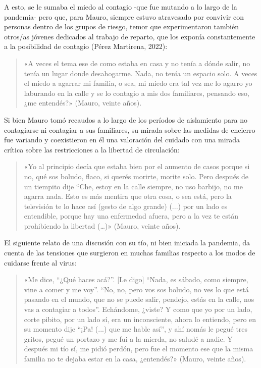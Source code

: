 A esto, se le sumaba el miedo al contagio -que fue mutando a lo largo de la pandemia- pero que, para Mauro, siempre estuvo atravesado por convivir con personas dentro de los grupos de riesgo, temor que experimentaron también otros/as jóvenes dedicados al trabajo de reparto, que los exponía constantemente a la posibilidad de contagio (Pérez Martirena, 2022):

\begin{quote}
«A veces el tema ese de como estaba en casa y no tenía a dónde salir, no tenía un lugar donde desahogarme. Nada, no tenía un espacio solo. A veces el miedo a agarrar mi familia, o sea, mi miedo era tal vez me lo agarro yo laburando en la calle y se lo contagio a mis dos familiares, pensando eso, ¿me entendés?» (Mauro, veinte años).
\end{quote}

Si bien Mauro tomó recaudos a lo largo de los períodos de aislamiento para no contagiarse ni contagiar a sus familiares, su mirada sobre las medidas de encierro fue variando y coexistieron en él una valoración del cuidado con una mirada crítica sobre las restricciones a la libertad de circulación:

\begin{quote}
«Yo al principio decía que estaba bien por el aumento de casos porque si no, qué sos boludo, flaco, si querés morirte, morite solo. Pero después de un tiempito dije ``Che, estoy en la calle siempre, no uso barbijo, no me agarra nada. Esto es más mentira que otra cosa, o sea está, pero la televisión te lo hace así (gesto de algo grande) (...) por un lado es entendible, porque hay una enfermedad afuera, pero a la vez te están prohibiendo la libertad (\ldots)» (Mauro, veinte años).
\end{quote}

El siguiente relato de una discusión con su tío, ni bien iniciada la pandemia, da cuenta de las tensiones que surgieron en muchas familias respecto a los modos de cuidarse frente al virus:

\begin{quote}
«Me dice, ``¿Qué haces acá?''. {[}Le digo{]} ``Nada, es sábado, como siempre, vine a comer y me voy''. ``No, no, pero vos sos boludo, no ves lo que está pasando en el mundo, que no se puede salir, pendejo, estás en la calle, nos vas a contagiar a todos''. Echándome, ¿viste? Y como que yo por un lado, corte pibito, por un lado sí, era un inconsciente, ahora lo entiendo, pero en su momento dije ``¡Pa! (...) que me hable así'', y ahí nomás le pegué tres gritos, pegué un portazo y me fui a la mierda, no saludé a nadie. Y después mi tío sí, me pidió perdón, pero fue el momento ese que la misma familia no te dejaba estar en la casa, ¿entendés?» (Mauro, veinte años).
\end{quote}

